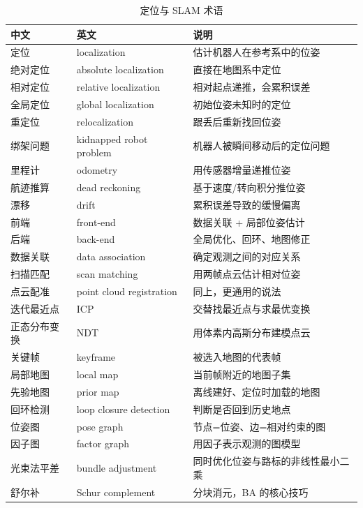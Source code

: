 \begin{table}[htbp]
  \centering
  \caption{定位与 SLAM 术语}\label{tab:b-slam}
  \footnotesize
  \begin{tabular}{llp{6.6cm}}
    \toprule
    中文 & 英文 & 说明 \\
    \midrule
    定位 & localization & 估计机器人在参考系中的位姿 \\
    绝对定位 & absolute localization & 直接在地图系中定位 \\
    相对定位 & relative localization & 相对起点递推，会累积误差 \\
    全局定位 & global localization & 初始位姿未知时的定位 \\
    重定位 & relocalization & 跟丢后重新找回位姿 \\
    绑架问题 & kidnapped robot problem & 机器人被瞬间移动后的定位问题 \\
    里程计 & odometry & 用传感器增量递推位姿 \\
    航迹推算 & dead reckoning & 基于速度/转向积分推位姿 \\
    漂移 & drift & 累积误差导致的缓慢偏离 \\
    前端 & front-end & 数据关联 + 局部位姿估计 \\
    后端 & back-end & 全局优化、回环、地图修正 \\
    数据关联 & data association & 确定观测之间的对应关系 \\
    扫描匹配 & scan matching & 用两帧点云估计相对位姿 \\
    点云配准 & point cloud registration & 同上，更通用的说法 \\
    迭代最近点 & ICP & 交替找最近点与求最优变换 \\
    正态分布变换 & NDT & 用体素内高斯分布建模点云 \\
    关键帧 & keyframe & 被选入地图的代表帧 \\
    局部地图 & local map & 当前帧附近的地图子集 \\
    先验地图 & prior map & 离线建好、定位时加载的地图 \\
    回环检测 & loop closure detection & 判断是否回到历史地点 \\
    位姿图 & pose graph & 节点=位姿、边=相对约束的图 \\
    因子图 & factor graph & 用因子表示观测的图模型 \\
    光束法平差 & bundle adjustment & 同时优化位姿与路标的非线性最小二乘 \\
    舒尔补 & Schur complement & 分块消元，BA 的核心技巧 \\

\end{tabular}
\end{table}
